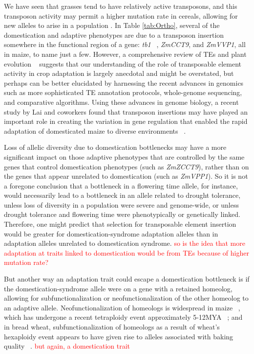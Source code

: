 \documentclass[12pt]{article}
\newcommand{\mbh}[1]{\textcolor{red}{\normalsize  #1}}
\begin{document}
We have seen that grasses tend to have relatively active transposons, and this transposon activity may permit a higher mutation rate in cereals, allowing for new alleles to arise in a population \citep{Wicker2016}. 
In Table \ref{tab:Ortho}, several of the domestication and adaptive phenotypes are due to a transposon insertion somewhere in the functional region of a gene: \textit{tb1} ~\citep{Studer2011}, \textit{ZmCCT9}, and \textit{ZmVVP1}, all in maize, to name just a few.
However, a comprehensive review of TEs and plant evolution ~\citep{Lisch2001} suggests that our understanding of the role of transposable element activity in crop adaptation is largely anecdotal and might be overstated, but perhaps can be better elucidated by harnessing the recent advances in genomics such as more sophisticated TE annotation protocols, whole-genome sequencing, and comparative algorithms.
Using these advances in genome biology, a recent study by Lai and coworkers found that transposon insertions may have played an important role in creating the variation in gene regulation that enabled the rapid adaptation of domesticated maize to diverse environments ~\citep{Lai2017}. 

Loss of allelic diversity due to domestication bottlenecks may have a more significant impact on those adaptive phenotypes that are controlled by the same genes that control domestication phenotypes (such as \textit{ZmZCCT9}), rather than on the genes that appear unrelated to domestication (such as \textit{ZmVPP1}).
So it is not a foregone conclusion that a bottleneck in a flowering time allele, for instance, would necessarily lead to a bottleneck in an allele related to drought tolerance, unless loss of diversity in a population were severe and genome-wide, or unless drought tolerance and flowering time were phenotypically or genetically linked.
Therefore, one might predict that selection for transposable element insertion would be greater for domestication-syndrome adaptation alleles than in adaptation alleles unrelated to domestication syndrome. \mbh{so is the idea that more adaptation at traits linked to domestication would be from TEs because of higher mutation rate?} 

But another way an adaptation trait could escape a domestication bottleneck is if the domestication-syndrome allele were on a gene with a retained homeolog, allowing for subfunctionalization or neofunctionalization of the other homeolog to an adaptive allele.
Neofunctionalization of homeologs is widespread in maize ~\citep{Hughes2014}, which has undergone a recent tetraploidy event approximately 5-12MYA ~\citep{Swigonova2004}; and in bread wheat, subfunctionalization of homeologs as a result of  wheat's hexaploidy event appears to have given rise to alleles associated with baking quality ~\citep{Pfeifer2014}. \mbh{but again, a domestication trait}
\end{document}
